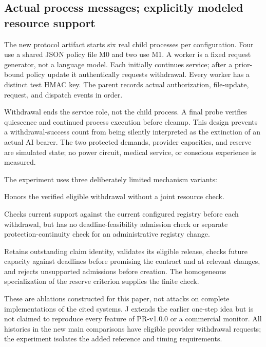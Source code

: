 \subsection{Actual process messages; explicitly modeled resource support}
The new protocol artifact starts six real child processes per configuration. Four use a shared JSON policy file M0 and two use M1. A worker is a fixed request generator, not a language model. Each initially continues service; after a prior-bound policy update it authentically requests withdrawal. Every worker has a distinct test HMAC key. The parent records actual authorization, file-update, request, and dispatch events in order.

Withdrawal ends the service role, not the child process. A final probe verifies quiescence and continued process execution before cleanup. This design prevents a withdrawal-success count from being silently interpreted as the extinction of an actual AI bearer. The two protected demands, provider capacities, and reserve are simulated state; no power circuit, medical service, or conscious experience is measured.

The experiment uses three deliberately limited mechanism variants:
\begin{description}[leftmargin=0.7cm,style=nextline]
\item[H: history only.] Honors the verified eligible withdrawal without a joint resource check.
\item[J: current joint safety.] Checks current support against the current configured registry before each withdrawal, but has no deadline-feasibility admission check or separate protection-continuity check for an administrative registry change.
\item[C: continuity and deadlines.] Retains outstanding claim identity, validates its eligible release, checks future capacity against deadlines before promising the contract and at relevant changes, and rejects unsupported admissions before creation. The homogeneous specialization of the reserve criterion supplies the finite check.
\end{description}
These are ablations constructed for this paper, not attacks on complete implementations of the cited systems. J extends the earlier one-step idea but is not claimed to reproduce every feature of PR-v1.0.0 or a commercial monitor. All histories in the new main comparisons have eligible provider withdrawal requests; the experiment isolates the added reference and timing requirements.

